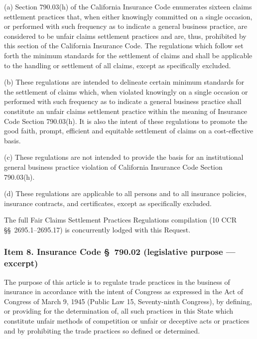 \begin{quoting}
\noindent (a) Section 790.03(h) of the California Insurance Code enumerates sixteen claims settlement practices that, when either knowingly committed on a single occasion, or performed with such frequency as to indicate a general business practice, are considered to be unfair claims settlement practices and are, thus, prohibited by this section of the California Insurance Code. The regulations which follow set forth the minimum standards for the settlement of claims and shall be applicable to the handling or settlement of all claims, except as specifically excluded.

\noindent (b) These regulations are intended to delineate certain minimum standards for the settlement of claims which, when violated knowingly on a single occasion or performed with such frequency as to indicate a general business practice shall constitute an unfair claims settlement practice within the meaning of Insurance Code Section 790.03(h). It is also the intent of these regulations to promote the good faith, prompt, efficient and equitable settlement of claims on a cost-effective basis.

\noindent (c) These regulations are not intended to provide the basis for an institutional general business practice violation of California Insurance Code Section 790.03(h).

\noindent (d) These regulations are applicable to all persons and to all insurance policies, insurance contracts, and certificates, except as specifically excluded.

\noindent The full Fair Claims Settlement Practices Regulations compilation (10 CCR \S\S~2695.1--2695.17) is concurrently lodged with this Request.
\end{quoting}

\subsubsection*{Item 8. Insurance Code \S~790.02 (legislative purpose --- excerpt)}

\begin{quoting}
\noindent The purpose of this article is to regulate trade practices in the business of insurance in accordance with the intent of Congress as expressed in the Act of Congress of March 9, 1945 (Public Law 15, Seventy-ninth Congress), by defining, or providing for the determination of, all such practices in this State which constitute unfair methods of competition or unfair or deceptive acts or practices and by prohibiting the trade practices so defined or determined.
\end{quoting}

